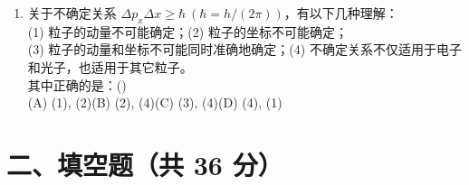 \documentclass[zihao=5,a4paper,UTF8]{ctexart}
\newcommand{\choicebox}{\hfill(\hspace{1.8em})}
\begin{document}
\begin{enumerate}[leftmargin=2em, itemsep=6pt]
    \item 关于不确定关系 $\Delta p_x \Delta x \ge \hbar\ (\hbar = h/(2\pi))$，有以下几种理解：\\
    (1) 粒子的动量不可能确定；\qquad (2) 粒子的坐标不可能确定；\\
    (3) 粒子的动量和坐标不可能同时准确地确定；\qquad (4) 不确定关系不仅适用于电子和光子，也适用于其它粒子。\\
    其中正确的是：\choicebox\\
    (A) (1), (2)\qquad (B) (2), (4)\qquad (C) (3), (4)\qquad (D) (4), (1)
\end{enumerate}

\section*{二、填空题（共 36 分）}
\end{document}
